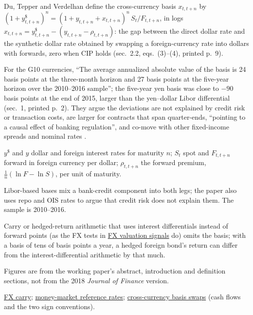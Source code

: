 \begin{qfevidence}\label{ev:cip-deviations}
 Du, Tepper and Verdelhan define the cross-currency basis $x_{t,t+n}$ by $(1+y^\$_{t,t+n})^n=(1+y_{t,t+n}+x_{t,t+n})^n\,S_t/F_{t,t+n}$, in logs $x_{t,t+n}=y^\$_{t,t+n}-(y_{t,t+n}-\rho_{t,t+n})$: the gap between the direct dollar rate and the synthetic dollar rate obtained by swapping a foreign-currency rate into dollars with forwards, zero when CIP holds (sec.~2.2, eqs.~(3)--(4), printed p.~9).

For the G10 currencies, ``The average annualized absolute value of the basis is 24 basis points at the three-month horizon and 27 basis points at the five-year horizon over the 2010--2016 sample''; the five-year yen basis was close to $-90$ basis points at the end of 2015, larger than the yen--dollar Libor differential (sec.~1, printed p.~2). They argue the deviations are not explained by credit risk or transaction costs, are larger for contracts that span quarter-ends, ``pointing to a causal effect of banking regulation'', and co-move with other fixed-income spreads and nominal rates \citep[NBER WP~23170, February 2017, abstract and secs.~1--2, printed pp.~1--9]{dtv-cip-2017}.

 $y^\$$ and $y$ dollar and foreign interest rates for maturity $n$; $S_t$ spot and $F_{t,t+n}$ forward in foreign currency per dollar; $\rho_{t,t+n}$ the forward premium, $\frac1n(\ln F-\ln S)$, per unit of maturity.

 Libor-based bases mix a bank-credit component into both legs; the paper also uses repo and OIS rates to argue that credit risk does not explain them. The sample is 2010--2016.

 Carry or hedged-return arithmetic that uses interest differentials instead of forward points (as the FX tests in \hyperref[meth:fx-valuation-signals]{FX valuation signals} do) omits the basis; with a basis of tens of basis points a year, a hedged foreign bond's return can differ from the interest-differential arithmetic by that much.

 Figures are from the working paper's abstract, introduction and definition sections, not from the 2018 \emph{Journal of Finance} version.

 \hyperref[mod:fx-carry-trade]{FX carry}; \hyperref[def:money-market-reference-rates]{money-market reference rates}; \hyperref[meth:cross-currency-basis-swaps]{cross-currency basis swaps} (cash flows and the two sign conventions).


\end{qfevidence}
